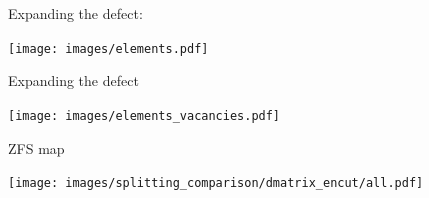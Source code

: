 \documentclass[notes=hide]{beamer}
\begin{document}

\begin{frame}{Expanding the defect:  }
  \begin{center}
    \texttt{[image: images/elements.pdf]}
  \end{center}
\end{frame}

\begin{frame}{Expanding the defect}
  \begin{center}
    \texttt{[image: images/elements\_vacancies.pdf]}
  \end{center}
\end{frame}

\begin{frame}{ZFS map}
  \begin{center}
    \texttt{[image: images/splitting\_comparison/dmatrix\_encut/all.pdf]}
  \end{center}
\end{frame}
\end{document}
